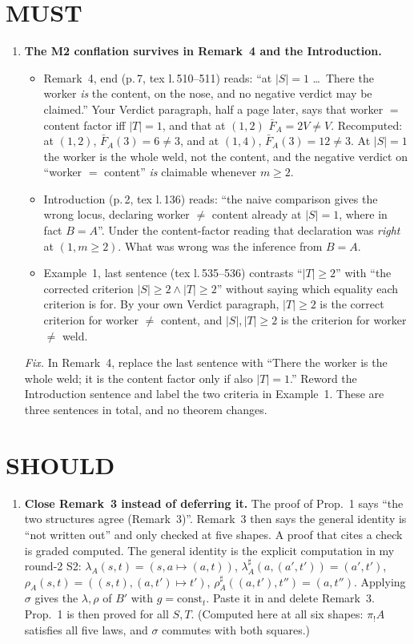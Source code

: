 \documentclass[10pt]{article}
\newcommand{\cst}{\mathrm{const}}
\begin{document}
\section*{MUST}
\begin{enumerate}[label=\textbf{M\arabic*.},leftmargin=*]
\item \textbf{The M2 conflation survives in Remark~4 and the Introduction.}
  \begin{itemize}[leftmargin=*]
  \item Remark~4, end (p.\,7, tex l.\,510--511) reads: ``at $|S|=1$ \dots\ There the worker \emph{is} the content, on the nose, and no
  negative verdict may be claimed.'' Your Verdict paragraph, half a page later, says that worker $=$ content factor iff $|T|=1$, and that at $(1,2)$
  $\bar F_A=2V\neq V$. Recomputed: at $(1,2)$, $\bar F_A(3)=6\neq3$, and at $(1,4)$, $\bar F_A(3)=12\neq3$. At $|S|=1$ the worker is the whole
  weld, not the content, and the negative verdict on ``worker $=$ content'' \emph{is} claimable whenever $m\ge2$.
  \item Introduction (p.\,2, tex l.\,136) reads: ``the naive comparison gives the wrong locus, declaring worker $\ne$ content already at
  $|S|=1$, where in fact $B=A$''. Under the content-factor reading that declaration was \emph{right} at $(1,m\ge2)$. What was
  wrong was the inference from $B=A$.
  \item Example~1, last sentence (tex l.\,535--536) contrasts ``$|T|\ge2$'' with ``the corrected criterion $|S|\ge2\wedge|T|\ge2$''
  without saying which equality each criterion is for. By your own Verdict paragraph, $|T|\ge2$ is the correct criterion for
  worker $\ne$ content, and $|S|,|T|\ge2$ is the criterion for worker $\ne$ weld.
  \end{itemize}
  \emph{Fix.} In Remark~4, replace the last sentence with ``There the worker is the whole weld; it is the content factor only if
  also $|T|=1$.'' Reword the Introduction sentence and label the two criteria in Example~1. These are three sentences in total, and no theorem changes.
\end{enumerate}

\section*{SHOULD}
\begin{enumerate}[label=\textbf{S\arabic*.},leftmargin=*]
\item \textbf{Close Remark~3 instead of deferring it.} The proof of Prop.~1 says ``the two structures agree (Remark~3)''. Remark~3
  then says the general identity is ``not written out'' and only checked at five shapes. A proof that cites a check is graded computed. The
  general identity is the explicit computation in my round-2 S2:
  $\lambda_A(s,t)=(s,a\mapsto(a,t))$, $\lambda_A^\sharp(a,(a',t'))=(a',t')$, $\rho_A(s,t)=((s,t),(a,t')\mapsto t')$,
  $\rho_A^\sharp((a,t'),t'')=(a,t'')$. Applying $\sigma$ gives the $\lambda,\rho$ of $B'$ with $g=\cst_t$. Paste it in and
  delete Remark~3. Prop.~1 is then proved for all $S,T$. (Computed here at all six shapes: $\pi_!A$ satisfies all five laws, and $\sigma$ commutes with both squares.)
\end{enumerate}
\end{document}

